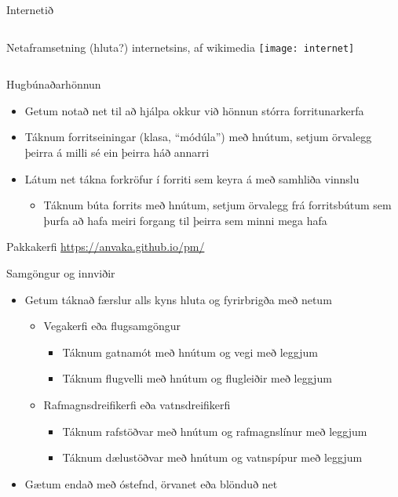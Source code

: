 \documentclass[handout]{beamer}
\begin{document}
\begin{frame}{Internetið}
\begin{columns}
Netaframsetning (hluta?) internetsins, af wikimedia
\texttt{[image: internet]}
\end{columns}
\end{frame}


\begin{frame}{Hugbúnaðarhönnun}
\begin{itemize}
 \item Getum notað net til að hjálpa okkur við hönnun stórra forritunarkerfa
 \item Táknum forritseiningar (klasa, ``módúla'') með hnútum, setjum örvalegg þeirra á milli sé ein þeirra háð annarri
 \item Látum net tákna forkröfur í forriti sem keyra á með samhliða vinnslu
 \begin{itemize}
  \item Táknum búta forrits með hnútum, setjum örvalegg frá forritsbútum sem þurfa að hafa meiri forgang til þeirra sem minni mega hafa
 \end{itemize}
\end{itemize}
\end{frame}

\begin{frame}{Pakkakerfi}
\url{https://anvaka.github.io/pm/}
\end{frame}

\begin{frame}{Samgöngur og innviðir}
\begin{itemize}
 \item Getum táknað færslur alls kyns hluta og fyrirbrigða með netum
 \begin{itemize}
  \item Vegakerfi eða flugsamgöngur
  \begin{itemize}
   \item Táknum gatnamót með hnútum og vegi með leggjum 
   \item Táknum flugvelli með hnútum og flugleiðir með leggjum
  \end{itemize}
  \item Rafmagnsdreifikerfi eða vatnsdreifikerfi
  \begin{itemize}
   \item Táknum rafstöðvar með hnútum og rafmagnslínur með leggjum
   \item Táknum dælustöðvar með hnútum og vatnspípur með leggjum
  \end{itemize}
 \end{itemize}
 \item Gætum endað með óstefnd, örvanet eða blönduð net
\end{itemize}
\end{frame}
\end{document}
